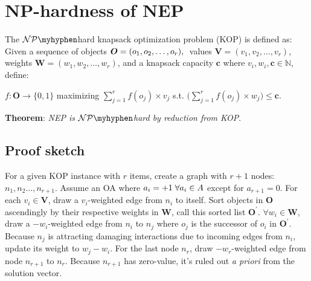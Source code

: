 \documentclass[12pt]{article}	%
\newcommand{\mys }{\hspace{0.1cm}}
\begin{document}
\newpage
\section{NP-hardness of NEP}\label{KOPdefinition}
    The $\mathcal{NP}\myhyphen$hard knapsack optimization problem (KOP)  \cite{karp_reducibility_2010} is defined as:
    Given a sequence of objects $\boldsymbol{O}=(o_1,o_2,\dots,o_r), \mys$ values $\boldsymbol{V}=(v_1,v_2,\dots,v_r)$,
    weights $\boldsymbol{W}=(w_1,w_2,\dots,w_r)$, and a knapsack capacity $\boldsymbol{c}$ where $v_i, w_i, \boldsymbol{c}  \in \mathbb{N}$,
    define:

    $f:\boldsymbol{O}  \rightarrow \{0,1\}$ maximizing $\sum\limits_{j=1}^{r} f(o_j)\times v_j$ s.t. $ \Bigg(  \sum\limits_{j=1}^{r} f(o_j)\times w_j  \Bigg)  \leq \boldsymbol{c}$.

    \vspace{20pt}
    \noindent\textbf{Theorem}: \textit{NEP is $\mathcal{NP}\myhyphen$hard by reduction from KOP}.
    \vspace{20pt}


\subsection{Proof sketch}\label{sup_proof_sketch}
				For a given KOP instance with $r$ items, create a graph with $r+1$ nodes: $n_1, n_2\dots, n_{r+1}$. Assume an OA where $a_i=+1 \mys \forall a_i \in  A$ except for $a_{r+1}=0$.
				For each $v_i\in\boldsymbol{V}$, draw a $v_i$-weighted edge from $n_i$ to itself.
				Sort objects in $\boldsymbol{O}$ ascendingly by their respective weights in $\boldsymbol{W}$, call this sorted
				list $\boldsymbol{O}^{\prime}$.
				$\forall w_i\in\boldsymbol{W}$, draw a $-w_i$-weighted edge from $n_i$ to $n_j$ where $o_j$ is
				the successor of $o_i$ in $\boldsymbol{O}^{\prime}$.
				Because $n_j$ is attracting damaging interactions due to incoming edges from $n_i$,
				update its weight to $w_j-w_i$.
				For the last node $n_r$, draw $-w_r$-weighted edge from node $n_{r+1}$ to $n_r$.
				Because $n_{r+1}$ has zero-value, it's ruled out \textit{a priori} from the solution vector.


\end{document}
